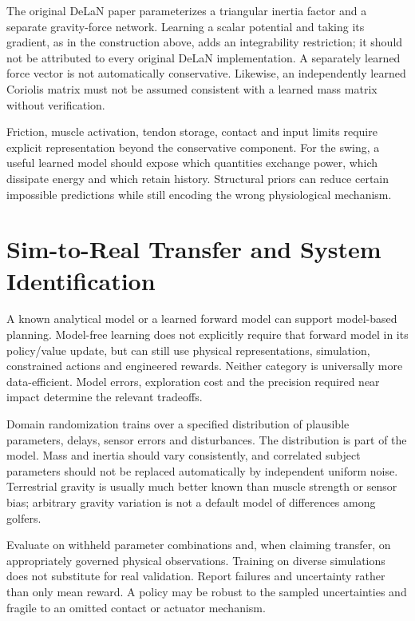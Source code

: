 The original DeLaN paper parameterizes a triangular inertia factor and a separate gravity-force network. Learning a scalar potential and taking its gradient, as in the construction above, adds an integrability restriction; it should not be attributed to every original DeLaN implementation. A separately learned force vector is not automatically conservative. Likewise, an independently learned Coriolis matrix must not be assumed consistent with a learned mass matrix without verification.

Friction, muscle activation, tendon storage, contact and input limits require explicit representation beyond the conservative component. For the swing, a useful learned model should expose which quantities exchange power, which dissipate energy and which retain history. Structural priors can reduce certain impossible predictions while still encoding the wrong physiological mechanism.

\section{Sim-to-Real Transfer and System Identification}

A known analytical model or a learned forward model can support model-based planning. Model-free learning does not explicitly require that forward model in its policy/value update, but can still use physical representations, simulation, constrained actions and engineered rewards. Neither category is universally more data-efficient. Model errors, exploration cost and the precision required near impact determine the relevant tradeoffs.

Domain randomization trains over a specified distribution of plausible parameters, delays, sensor errors and disturbances. The distribution is part of the model. Mass and inertia should vary consistently, and correlated subject parameters should not be replaced automatically by independent uniform noise. Terrestrial gravity is usually much better known than muscle strength or sensor bias; arbitrary gravity variation is not a default model of differences among golfers.

Evaluate on withheld parameter combinations and, when claiming transfer, on appropriately governed physical observations. Training on diverse simulations does not substitute for real validation. Report failures and uncertainty rather than only mean reward. A policy may be robust to the sampled uncertainties and fragile to an omitted contact or actuator mechanism.

